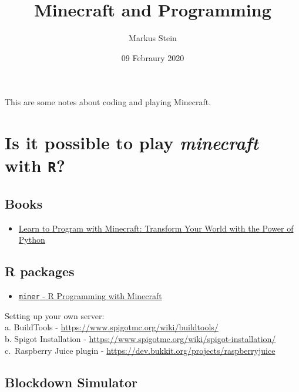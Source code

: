 \documentclass[
]{article}
\title{Minecraft and Programming}
\author{Markus Stein}
\date{09 Febraury 2020}
\providecommand{\tightlist}{%
  \setlength{\itemsep}{0pt}\setlength{\parskip}{0pt}}
\begin{document}
\maketitle

This are some notes about coding and playing Minecraft.

\hypertarget{is-it-possible-to-play-minecraft-with-r}{%
\section{\texorpdfstring{Is it possible to play \emph{minecraft} with
\texttt{R}?}{Is it possible to play minecraft with R?}}\label{is-it-possible-to-play-minecraft-with-r}}

\hypertarget{books}{%
\subsection{Books}\label{books}}

\begin{itemize}
\tightlist
\item
  \href{https://nostarch.com/programwithminecraft}{Learn to Program with
  Minecraft: Transform Your World with the Power of Python}
\end{itemize}

\hypertarget{r-packages}{%
\subsection{R packages}\label{r-packages}}

\begin{itemize}
\tightlist
\item
  \href{https://ropenscilabs.github.io/miner_book/index.html}{\texttt{miner}
  - R Programming with Minecraft}
\end{itemize}

Setting up your own server:\\
a. BuildTools - \url{https://www.spigotmc.org/wiki/buildtools/}\\
b. Spigot Installation -
\url{https://www.spigotmc.org/wiki/spigot-installation/}\\
c.~Raspberry Juice plugin -
\url{https://dev.bukkit.org/projects/raspberryjuice}

\hypertarget{blockdown-simulator}{%
\subsection{Blockdown Simulator}\label{blockdown-simulator}}
\end{document}
